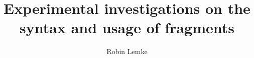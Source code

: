 \title{Experimental investigations\newlineCover{} on the syntax and usage of fragments}
\author{Robin Lemke}
\renewcommand{\lsSeries}{ogl}%
\renewcommand{\lsSeriesNumber}{}

\renewcommand{\lsCoverTitleFont}[1]{%
    \sffamily\addfontfeatures{Scale=MatchUppercase}%
    \fontsize{45pt}{15mm}\selectfont #1}
